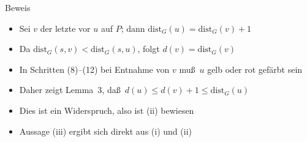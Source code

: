 \documentclass[aspectratio=1610, 11pt]{beamer}
\newcommand\dist{\mathrm{dist}}
\begin{document}
\begin{frame}
\begin{overprint}
\begin{exampleblock}{Beweis}
\begin{itemize}
				\item Sei $v$ der letzte vor $u$ auf $P$; dann $\dist_G(u)=\dist_G(v)+1$
				\item Da $\dist_G(s,v)<\dist_G(s,u)$, folgt $d(v)=\dist_G(v)$
				\item In Schritten (8)--(12) bei Entnahme von $v$ mu\ss\ $u$ gelb oder rot gef\"arbt sein
				\item Daher zeigt Lemma~3, da\ss\ $d(u)\leq d(v)+1\leq\dist_G(u)$
				\item Dies ist ein Widerspruch, also ist (ii) bewiesen
				\item Aussage (iii) ergibt sich direkt aus (i) und (ii)
			\end{itemize}
		\end{exampleblock}
	\end{overprint}
\end{frame}
\end{document}
